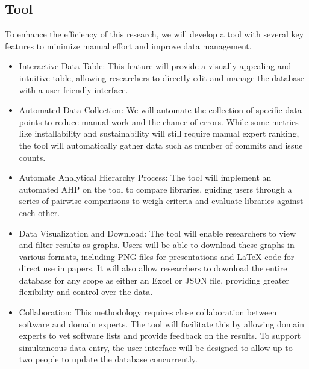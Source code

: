 \documentclass{article}
\begin{document}
\begin{itemize}
\begin{itemize}
\subsection{Tool}
To enhance the efficiency of this research, we will develop a tool with several key features to minimize manual effort and improve data management.
\begin{itemize}
    \item Interactive Data Table: This feature will provide a visually appealing and intuitive table, allowing researchers to directly edit and manage the database with a user-friendly interface.
    \item Automated Data Collection: We will automate the collection of specific data points to reduce manual work and the chance of errors. While some metrics like installability and sustainability will still require manual expert ranking, the tool will automatically gather data such as number of commits and issue counts.
    \item Automate Analytical Hierarchy Process: The tool will implement an automated AHP on the tool to compare libraries, guiding users through a series of pairwise comparisons to weigh criteria and evaluate libraries against each other.
    \item Data Visualization and Download: The tool will enable researchers to view and filter results as graphs. Users will be able to download these graphs in various formats, including PNG files for presentations and LaTeX code for direct use in papers. It will also allow researchers to download the entire database for any scope as either an Excel or JSON file, providing greater flexibility and control over the data.
    \item Collaboration: This methodology requires close collaboration between software and domain experts. The tool will facilitate this by allowing domain experts to vet software lists and provide feedback on the results. To support simultaneous data entry, the user interface will be designed to allow up to two people to update the database concurrently.
\end{itemize}


\end{itemize}
\end{itemize}
\end{document}
